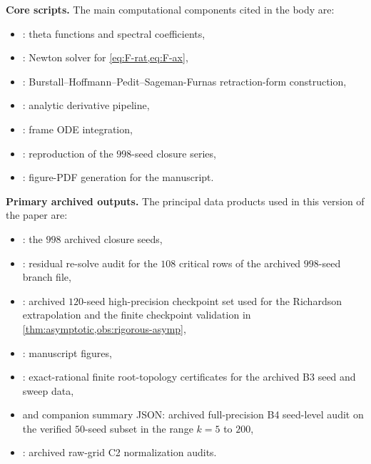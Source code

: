 \documentclass[11pt,a4paper]{article}
\theoremstyle{plain}
\theoremstyle{definition}
\theoremstyle{remark}
\begin{document}
\noindent\textbf{Core scripts.}
The main computational components cited in the body are:
\begin{itemize}[nosep]
\item {}: theta functions and spectral coefficients,
\item {}: Newton solver for
  \cref{eq:F-rat,eq:F-ax},
\item {}: Burstall--Hoffmann--Pedit--Sageman-Furnas
  retraction-form construction,
\item {}: analytic derivative pipeline,
\item {}: frame ODE integration,
\item {}: reproduction of the $998$-seed closure series,
\item {}: figure-PDF generation for the manuscript.
\end{itemize}

\noindent\textbf{Primary archived outputs.}
The principal data products used in this version of the paper are:
\begin{itemize}[nosep]
\item {}:
  the $998$ archived closure seeds,
\item {}:
  residual re-solve audit for the $108$ critical rows of the archived
  $998$-seed branch file,
\item {}:
  archived $120$-seed high-precision checkpoint set used for the
  Richardson extrapolation and the finite checkpoint validation in
  \cref{thm:asymptotic,obs:rigorous-asymp},
\item {}: manuscript figures,
\item {}: exact-rational finite
  root-topology certificates for the archived B3 seed and sweep data,
\item {}
  and companion summary JSON: archived full-precision B4 seed-level audit on
  the verified $50$-seed subset in the range $k=5$ to $200$,
\item {}: archived raw-grid C2 normalization audits.
\end{itemize}
\end{document}

